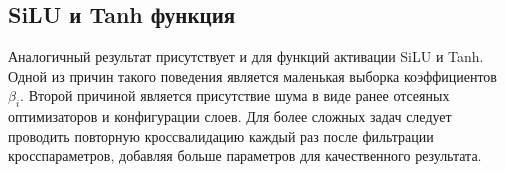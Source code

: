 \subsection{SiLU и Tanh функция}
Аналогичный результат присутствует и для функций активации SiLU и Tanh. Одной
из причин такого поведения является маленькая выборка коэффициентов $\beta_i$.
Второй причиной является присутствие шума в виде ранее отсеяных оптимизаторов
и конфигурации слоев. Для более сложных задач следует проводить повторную
кроссвалидацию каждый раз после фильтрации кросспараметров, добавляя больше
параметров для качественного результата.
